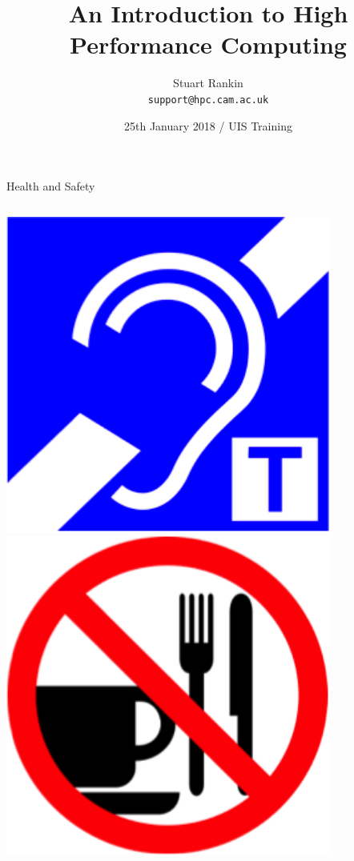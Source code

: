 \documentclass{beamer}
\title[HPC: An introduction] %
{An Introduction to High Performance Computing}
\author[SJ Rankin, P Sumption, J Salmond] %
{Stuart Rankin\\ \texttt{support@hpc.cam.ac.uk}}
\institute[Research Computing Services, University of Cambridge] %
{Research Computing Services (http://www.hpc.cam.ac.uk/ http://www.csd3.cam.ac.uk/)\\
University Information Services (http://www.uis.cam.ac.uk/)}
\date[18/10/2017] %
{25th January 2018 / UIS Training}
\begin{document}
\begin{frame}
  \titlepage
\end{frame}

\begin{frame}{Health and Safety}
\begin{columns}[c]
\begin{column}{0.33\textwidth}
\begin{center}
\includegraphics[width=0.8\textwidth,height=0.5\textheight,keepaspectratio]{imgs/health-safety-1.png}\\
\includegraphics[width=0.8\textwidth,height=0.5\textheight,keepaspectratio]{imgs/health-safety-4.png}

\end{center}
\end{column}
\end{columns}
\end{frame}
\end{document}

